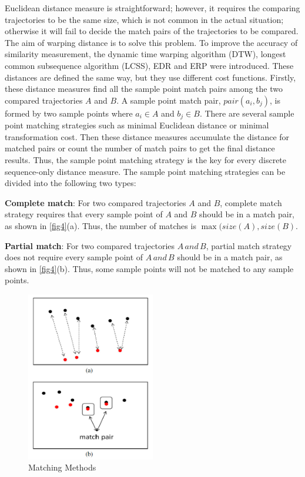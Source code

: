 \documentclass[a4paper, 12pt]{article}
\begin{document}
Euclidean distance measure is straightforward; however, it requires the comparing trajectories to be the same size, which is not common in the actual situation; otherwise it will fail to decide the match pairs of the trajectories to be compared. The aim of warping distance is to solve this problem. To improve the accuracy of similarity measurement, the dynamic time warping algorithm (DTW), longest common subsequence algorithm (LCSS), EDR and ERP were introduced. These distances are defined the same way, but they use different cost functions. Firstly, these distance measures find all the sample point match pairs among the two compared trajectories $A$ and $B$. A sample point match pair, $pair(a_{i},b_{j})$, is formed by two sample points where $a_{i} \in A$ and $b_{j} \in B$. There are several sample point matching strategies such as minimal Euclidean distance or minimal transformation cost. Then these distance measures accumulate the distance for matched pairs or count the number of match pairs to get the final distance results. Thus, the sample point matching strategy is the key for every discrete sequence-only distance measure. The sample point matching strategies can be divided into the following two types:

\textbf{Complete match}: For two compared trajectories $A$ and $B$, complete match strategy requires that every sample point of $A$ and $B$ should be in a match pair, as shown in \autoref{fig4}(a). Thus, the number of matches is $\max(size(A),size(B)$.

\textbf{Partial match}: For two compared trajectories $A\,and\,B$, partial match strategy does not require every sample point of $A\,and\,B$ should be in a match pair, as shown in \autoref{fig4}(b). Thus, some sample points will not be matched to any sample points.

\begin{figure}[ht]
    \centering
    \includegraphics[width=0.5\textwidth]{Matching Methods.png}
    \caption{Matching Methods \citep{su2020survey}}
    \label{fig4}
\end{figure}
\end{document}
